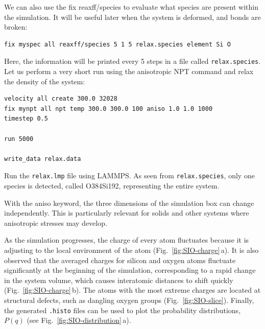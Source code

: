 \documentclass[9pt,tutorial]{livecoms}
\newcommand{\lmpcmd}[1]{\hspace{0pt}\colorbox{listing}{\textcolor{command}{\small{#1}}}\hspace{0pt}} %
\newcommand{\flecmd}[1]{\textcolor{command}{\texttt{#1}}} %
\begin{document}
We can also use the \lmpcmd{fix reaxff/species} to evaluate what species are
present within the simulation.  It will be useful later when the system is deformed,
and bonds are broken:
\begin{lstlisting}
fix myspec all reaxff/species 5 1 5 relax.species element Si O
\end{lstlisting}
Here, the information will be printed every 5 steps in a file called \flecmd{relax.species}.
Let us perform a very short run using the anisotropic NPT command and relax the
density of the system:
\begin{lstlisting}
velocity all create 300.0 32028
fix mynpt all npt temp 300.0 300.0 100 aniso 1.0 1.0 1000
timestep 0.5

run 5000

write_data relax.data
\end{lstlisting}
Run the \flecmd{relax.lmp} file using LAMMPS.  As seen from \flecmd{relax.species},
only one species is detected, called \lmpcmd{O384Si192}, representing the entire system.

\begin{note}
{\color{blue}With the \lmpcmd{aniso} keyword, the three dimensions of the simulation
box can change independently.  This is particularly relevant for solids and other
systems where anisotropic stresses may develop.}
\end{note}

As the simulation progresses, the charge of every atom fluctuates
because it is adjusting to the local environment of the atom (Fig.~\ref{fig:SIO-charge}\,a).
It is also observed that the averaged charges for silicon and oxygen
atoms fluctuate significantly at the beginning of the simulation, corresponding
to a rapid change in the system volume, which causes interatomic distances to
shift quickly (Fig.~\ref{fig:SIO-charge}\,b).  The atoms with the
most extreme charges are located at structural defects,
such as dangling oxygen groups (Fig.~\ref{fig:SIO-slice}).
Finally, the generated \flecmd{.histo} files can be used to
plot the probability distributions, $P(q)$ (see Fig.~\ref{fig:SIO-distribution}\,a).
\end{document}
